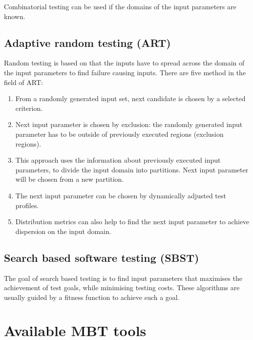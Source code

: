 \documentclass{article}
\begin{document}
Combinatorial testing can be used if the domains of the input parameters are known.


\subsection{Adaptive random testing (ART)}
\label{sub:randomtesting}

Random testing is based on that the inputs have to spread across the domain of the input parameters to find failure causing inputs. There are five method in the field of ART:

\begin{enumerate}
	\item From a randomly generated input set, next candidate is chosen by a selected criterion.
	\item Next input parameter is chosen by exclusion: the randomly generated input parameter has to be outside of previously executed regions (exclusion regions).
	\item This approach uses the information about previously executed input parameters, to divide the input domain into partitions. Next input parameter will be chosen from a new partition.
	\item The next input parameter can be chosen by dynamically adjusted test profiles.
	\item Distribution metrics can also help to find the next input parameter to achieve dispersion on the input domain.
\end{enumerate}


\subsection{Search based software testing (SBST)}
\label{sub:searchbasedtestgen}

The goal of search based testing is to find input parameters that maximises the achievement of test goals, while minimising testing costs. These algorithms are usually guided by a fitness function to achieve such a goal.



\newpage

\section{Available MBT tools}
\label{sec:mbttools}
\end{document}
